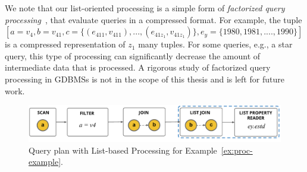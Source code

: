 We note that our list-oriented processing is a simple form of {\em factorized query processing}~\cite{fct-databases}, that evaluate queries in a compressed format. For example, the tuple  $[a=v_4, b=v_{41}, c=\{(e_{411}, v_{411}), ..., (e_{41z_1}, v_{41z_1})\}, e_y=\{1980, 1981, ...., 1990\}]$ is a compressed representation of $z_1$ many tuples. For some queries, e.g., a star query, this type of processing can significantly decrease the amount of intermediate data that is processed. A rigorous study of factorized query processing in GDBMSs is not in the scope of this thesis and is left for future work.

\begin{figure}
	\hfill\includegraphics[scale=0.78]{img/proc-lbqp}\hfill
	\vspace{-10pt}
	\caption{Query plan with List-based Processing for Example~\ref{ex:proc-example}.}
	\vspace{-8pt}
	\label{fig:proc-lbqp}
\end{figure}









